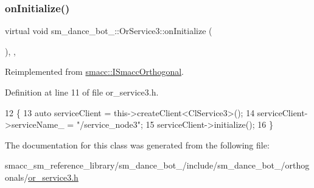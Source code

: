 \subsubsection{\texorpdfstring{on\+Initialize()}{onInitialize()}}
{\footnotesize\ttfamily virtual void sm\+\_\+dance\+\_\+bot\+\_\+::\+Or\+Service3\+::on\+Initialize (\begin{DoxyParamCaption}{ }\end{DoxyParamCaption})\hspace{0.3cm}{\ttfamily [inline]}, {\ttfamily [override]}, {\ttfamily [virtual]}}



Reimplemented from \hyperlink{classsmacc_1_1ISmaccOrthogonal_a6bb31c620cb64dd7b8417f8705c79c7a}{smacc\+::\+I\+Smacc\+Orthogonal}.



Definition at line 11 of file or\+\_\+service3.\+h.


\begin{DoxyCode}
12     \{
13         \textcolor{keyword}{auto} serviceClient = this->createClient<ClService3>();
14         serviceClient->serviceName\_ = \textcolor{stringliteral}{"/service\_node3"};
15         serviceClient->initialize();
16     \}
\end{DoxyCode}


The documentation for this class was generated from the following file\+:\begin{DoxyCompactItemize}
\item 
smacc\+\_\+sm\+\_\+reference\+\_\+library/sm\+\_\+dance\+\_\+bot\+\_/include/sm\+\_\+dance\+\_\+bot\+\_/orthogonals/\hyperlink{2_2include_2sm__dance__bot__2_2orthogonals_2or__service3_8h}{or\+\_\+service3.\+h}\end{DoxyCompactItemize}
